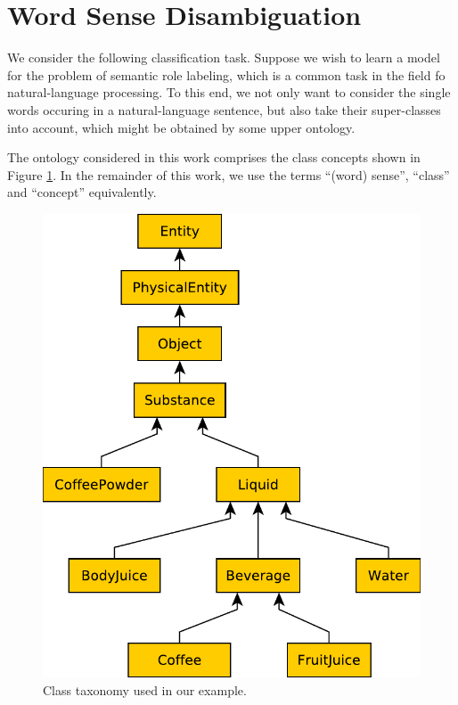 \documentclass[12pt,a4paper]{article}
\begin{document}
\section{Word Sense Disambiguation}

We consider the following classification task. Suppose we wish to 
learn a model for the problem of semantic role labeling, which is a 
common task in the field fo natural-language processing. To this 
end, we not only want to consider the single words occuring in a 
natural-language sentence, but also take their super-classes into 
account, which might be obtained by some upper ontology. 

The ontology considered in this work comprises the class concepts 
shown in Figure \ref{fig:taxonomy}. In the remainder of this work, we 
use the terms ``(word) sense'', ``class'' and ``concept'' equivalently.

\begin{figure}[tbp]
	\centering
	\includegraphics[height=.3\paperheight]{simple_onto.pdf}
	\caption{Class taxonomy used in our example.}
	\label{fig:taxonomy}
\end{figure}
\end{document}
